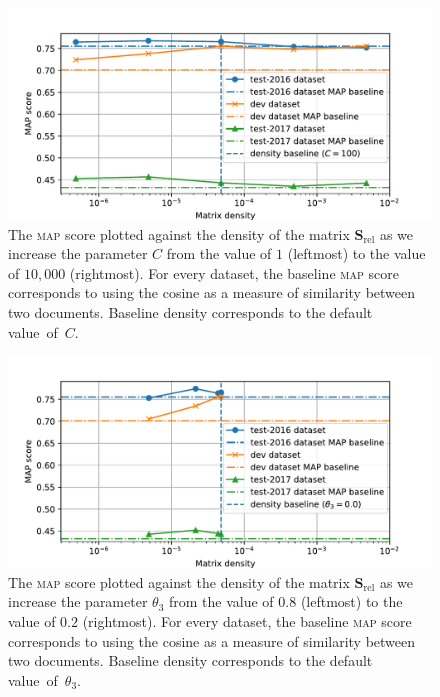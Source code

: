 \documentclass[
  digital, %
  notable, %
  lof,     %
  lot,     %
  nopalatino, color
]{fithesis3}
\def\abbr#1{\textsc{\MakeLowercase{#1}}}
\begin{document}
\begin{figure}[p]
\centering%
\includegraphics[trim={0.6cm 0.1cm 1.5cm 1.0cm}, scale=0.75]{figs/fig2}
\caption[A \abbr{MAP}-density plot for matrix $\mathbf S_{\textrm{rel}}$
and parameter $C$]{The \abbr{MAP}\index{map@\protect\abbr{MAP}}
  score plotted against the density of the matrix $\mathbf S_{\textrm{rel}}$
   as we increase the parameter $C$
   from the value of $1$ (leftmost) to the value of $10{,}000$
  (rightmost). For every dataset, the baseline \abbr{MAP} score
  corresponds to using the cosine as a measure of similarity between two
  documents. Baseline density corresponds to the default value~of~$C$.}
  \label{fig:similarity-fig2}
\end{figure}

\begin{figure}[p]
\centering%
\includegraphics[trim={0.6cm 0.1cm 1.5cm 1.0cm}, scale=0.75]{figs/fig3}
\caption[A \abbr{MAP}-density plot for matrix $\mathbf S_{\textrm{rel}}$
and parameter $\theta_3$]{The
  \abbr{MAP}\index{map@\protect\abbr{MAP}} score plotted against the density of
  the matrix $\mathbf S_{\textrm{rel}}$ 
  as we increase the parameter $\theta_3$ from
  the value of $0.8$ (leftmost) to the value of $0.2$ (rightmost). For every
  dataset, the baseline \abbr{MAP} score corresponds to using the cosine as a measure
  of similarity between two documents. Baseline density corresponds to the
  default value~of~$\theta_3$.}
  \label{fig:similarity-fig3}
\end{figure}
\end{document}
